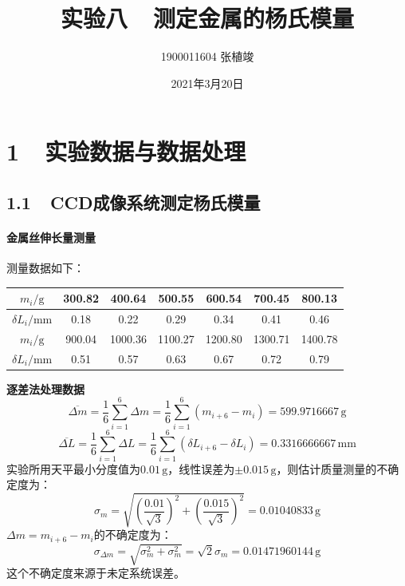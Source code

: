 \documentclass[a4paper,fontset=windows]{ctexart}
\begin{document}
    \title{\textbf{实验八\ \ 测定金属的杨氏模量}}
    \author{1900011604 张植竣}
    \date{2021年3月20日}
    \maketitle

    \section*{1\ \  实验数据与数据处理}

    \subsection*{1.1\ \ CCD成像系统测定杨氏模量}

    \paragraph*{金属丝伸长量测量} 测量数据如下：

    \begin{table}[h!]
        \begin{center}
            \begin{tabular}{|c|c|c|c|c|c|c|}
                \hline
                $m_i/\mathrm{g}$ & 300.82 & 400.64 & 500.55 & 600.54 & 700.45 & 800.13 \\
                \hline
                $\delta L_i/\mathrm{mm}$ & 0.18 & 0.22 & 0.29 & 0.34 & 0.41 & 0.46 \\
                \hline
                $m_i/\mathrm{g}$ & 900.04 & 1000.36 & 1100.27 & 1200.80 & 1300.71 & 1400.78 \\
                \hline
                $\delta L_i/\mathrm{mm}$ & 0.51 & 0.57 & 0.63 & 0.67 & 0.72 & 0.79 \\
                \hline
            \end{tabular}
        \end{center}
    \end{table}
    \vspace{-1.5em}

    \textbf{逐差法处理数据}
    \[
    \overline{\Delta m} = \frac{1}{6}\sum_{i=1}^{6}\Delta m = \frac{1}{6}\sum_{i=1}^{6}(m_{i+6} - m_i) = 599.9716667\,\mathrm{g}
    \]
    \[
    \overline{\Delta L} = \frac{1}{6}\sum_{i=1}^{6}\Delta L = \frac{1}{6}\sum_{i=1}^{6}(\delta L_{i+6} - \delta L_i) = 0.3316666667\,\mathrm{mm}
    \]
    实验所用天平最小分度值为$0.01\,\mathrm{g}$，线性误差为$\pm0.015\,\mathrm{g}$，则估计质量测量的不确定度为：
    \[
    \sigma_m = \sqrt{\left(\frac{0.01}{\sqrt{3}}\right)^2 + \left(\frac{0.015}{\sqrt{3}}\right)^2} = 0.01040833\,\mathrm{g}
    \]
    $\Delta m = m_{i+6} - m_i$的不确定度为：
    \[
    \sigma_{\Delta m} = \sqrt{\sigma_m^2 + \sigma_m^2} = \sqrt{2}\sigma_m = 0.01471960144\,\mathrm{g}
    \]
    这个不确定度来源于未定系统误差。
\end{document}
